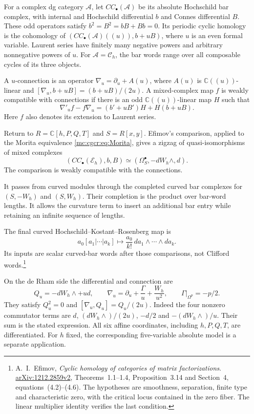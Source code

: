 For a complex dg category $\mathcal A$, let
$CC_\bullet(\mathcal A)$ be its absolute Hochschild bar
complex, with internal and Hochschild differential $b$
and Connes differential $B$. These odd operators satisfy
$b^2=B^2=bB+Bb=0$. Its periodic cyclic homology is the
cohomology of $(CC_\bullet(\mathcal A)((u)),b+uB)$,
where $u$ is an even formal variable. Laurent series have
finitely many negative powers and arbitrary nonnegative
powers of $u$. For
$\mathcal A=\mathcal C_h$, the bar words range over all
composable cycles of its three objects.

A $u$-connection is an operator $\nabla_u=\partial_u+A(u)$,
where $A(u)$ is $\mathbb C((u))$-linear and
$[\nabla_u,b+uB]=(b+uB)/(2u)$.
A mixed-complex map $f$ is weakly compatible with
connections if there is an odd $\mathbb C((u))$-linear map
$H$ such that
\[
 \nabla'_u f-f\nabla_u=(b'+uB')H+H(b+uB).
\]
Here $f$ also denotes its extension to Laurent series.

Return to $R=\mathbb C[h,P,Q,T]$ and $S=R[x,y]$.
Efimov's comparison, applied to the Morita equivalence
\eqref{mc:cgcr:eq:Morita}, gives a zigzag of quasi-isomorphisms
of mixed complexes
\begin{equation}\label{mc:cgcr:eq:cyclic}
 (CC_\bullet(\mathcal E_h),b,B)
     \simeq(\Omega_S^\bullet,-dW_h\wedge,d).
\end{equation}
The comparison is weakly compatible with the connections.

It passes from curved modules through the completed
curved bar complexes for $(S,-W_h)$ and $(S,W_h)$.
Their completion is the product over bar-word lengths.
It allows the curvature term to insert an additional
bar entry while retaining an infinite sequence of lengths.

The final curved Hochschild--Kostant--Rosenberg map is
\[
 a_0[a_1|\cdots|a_k]\longmapsto
       \frac{a_0}{k!}\,da_1\wedge\cdots\wedge da_k.
\]
Its inputs are scalar curved-bar words after those
comparisons, not Clifford words.\footnote{A.~I.~Efimov,
\emph{Cyclic homology of categories of matrix factorizations}.
\href{https://arxiv.org/abs/1212.2859v2}{arXiv:1212.2859v2},
Theorems~1.1--1.4, Proposition~3.14 and Section~4,
equations~(4.2)--(4.6). The hypotheses are smoothness,
separation, finite type and characteristic zero, with
the critical locus contained in the zero fiber.
The linear multiplier identity verifies the last condition.}

On the de Rham side the differential and connection are
\begin{equation}\label{mc:cgcr:eq:connection}
 Q_u=-dW_h\wedge+ud,\qquad
 \nabla_u=\partial_u+\frac{\Gamma}{u}+\frac{W_h}{u^2},
 \qquad \Gamma|_{\Omega^p}=-p/2.
\end{equation}
They satisfy $Q_u^2=0$ and
$[\nabla_u,Q_u]=Q_u/(2u)$.
Indeed the four nonzero commutator terms are
$d$, $(dW_h\wedge)/(2u)$, $-d/2$ and
$-(dW_h\wedge)/u$. Their sum is the stated expression.
All six affine coordinates, including $h,P,Q,T$, are
differentiated. For $h$ fixed, the corresponding
five-variable absolute model is a separate application.


